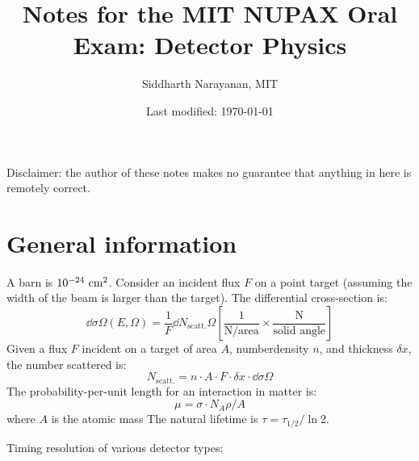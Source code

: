

\pagestyle{fancy}
\chead{\today}
\setcounter{section}{-1}


\title{Notes for the MIT NUPAX Oral Exam: Detector Physics}
\date{Last modified: \today}
\author{Siddharth Narayanan, MIT}

\maketitle

\vspace{20mm}
\begin{center}
Disclaimer: the author of these notes makes no guarantee that anything in here is remotely correct. 
\end{center}
\clearpage
\tableofcontents
\clearpage


\section{General information}

A barn is $10^{-24}~\text{cm}^2$. Consider an incident flux $F$ on a point target (assuming the width of the beam is larger than the target). The differential cross-section is:
\begin{equation}
  \dd{\sigma}{\Omega}(E,\Omega) = \frac{1}{F} \dd{N_\text{scatt.}}{\Omega} \left[\frac{1}{\text{N/area}} \times \frac{\text{N}}{\text{solid angle}}\right]
\end{equation}
Given a flux $F$ incident on a target of area $A$, numberdensity $n$, and thickness $\delta x$, the number scattered is:
\begin{equation}
  N_\text{scatt.} = n\cdot A\cdot F\cdot \delta x \cdot \dd\sigma\Omega
\end{equation}
The probability-per-unit length for an interaction in matter is:
\begin{equation}
  \mu = \sigma\cdot N_A\rho/A
\end{equation}
where $A$ is the atomic mass
\noindent The natural lifetime is $\tau = \tau_{1/2}/\ln 2$.

\noindent Timing resolution of various detector types:

